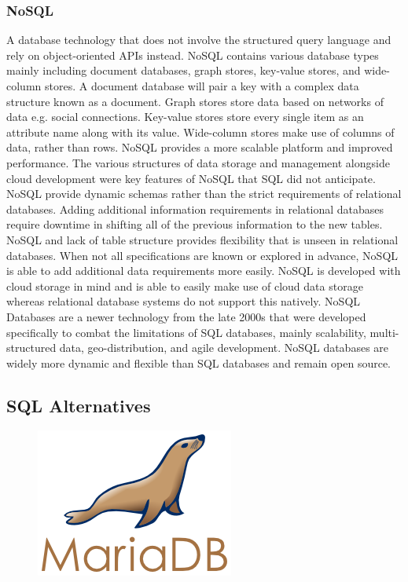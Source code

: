 \documentclass[12pt]{report}
\begin{document}
\subsubsection*{NoSQL}

A database technology that does not involve the structured query language and rely on object-oriented APIs instead.  NoSQL contains various database types mainly including document databases, graph stores, key-value stores, and wide-column stores.  A document database will pair a key with a complex data structure known as a document.  Graph stores store data based on networks of data e.g. social connections.  Key-value stores store every single item as an attribute name along with its value.  Wide-column stores make use of columns of data, rather than rows.  NoSQL provides a more scalable platform and improved performance.  The various structures of data storage and management alongside cloud development were key features of NoSQL that SQL did not anticipate.
NoSQL provide dynamic schemas rather than the strict requirements of relational databases.  Adding additional information requirements in relational databases require downtime in shifting all of the previous information to the new tables.  NoSQL and lack of table structure provides flexibility that is unseen in relational databases.  When not all specifications are known or explored in advance, NoSQL is able to add additional data requirements more easily.  NoSQL is developed with cloud storage in mind and is able to easily make use of cloud data storage whereas relational database systems do not support this natively.
NoSQL Databases are a newer technology from the late 2000s that were developed specifically to combat the limitations of SQL databases, mainly scalability, multi-structured data, geo-distribution, and agile development.  NoSQL databases are widely more dynamic and flexible than SQL databases and remain open source.

\subsection*{SQL Alternatives}

\begin{figure}[h]
	\centering
	\includegraphics[width=0.251\linewidth]{mariadb}
\end{figure}
\end{document}

